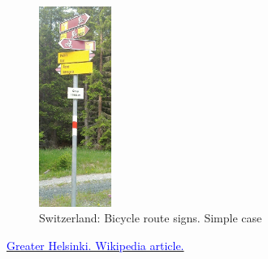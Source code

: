 \documentclass[a4paper]{article}
\newcommand{\myhref}[2]{{\href{#1}{\textcolor{blue}{#2}}}}
\begin{document}
\begin{figure}[!h]
\centerline{\includegraphics[keepaspectratio,height=6.5cm]{swiss1}}
\caption{Switzerland: Bicycle route signs. Simple case}
\end{figure}
\newpage

\begin{thebibliography}{9}
 \myhref{http://en.wikipedia.org/wiki/Greater_Helsinki}{Greater Helsinki. Wikipedia article.}
\end{thebibliography}
\end{document}
